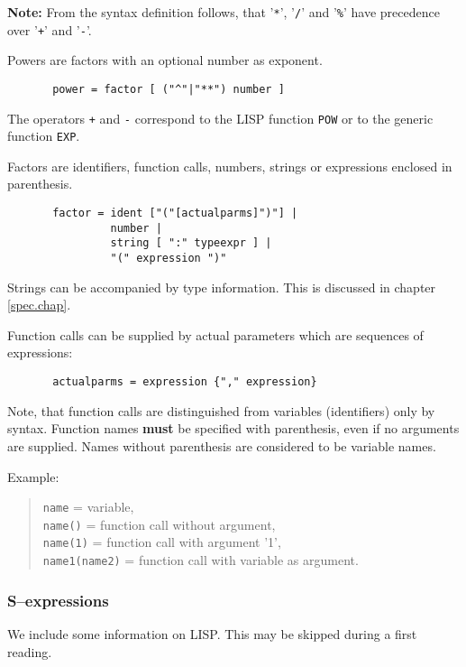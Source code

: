 {\bf Note:} From the syntax definition follows, that 
'\verb/*/', '\verb./.' and '\verb/%/' have precedence
over '\verb/+/' and '\verb/-/'.

Powers are factors with an optional number as exponent.
\begin{verbatim}
       power = factor [ ("^"|"**") number ]
\end{verbatim}
The operators \verb/+/ and \verb/-/ correspond to
the LISP function \verb/POW/  
or to the generic function \verb/EXP/.

Factors are identifiers, function calls, numbers, strings
or expressions enclosed in parenthesis.
\begin{verbatim}
       factor = ident ["("[actualparms]")"] |
                number | 
                string [ ":" typeexpr ] |
                "(" expression ")"
\end{verbatim}
Strings can be accompanied by type information. 
This is discussed in chapter \ref{spec.chap}.

Function calls can be supplied by actual parameters which
are sequences of expressions:
\begin{verbatim}
       actualparms = expression {"," expression}
\end{verbatim}

Note, that function calls are distinguished from 
variables (identifiers) only by syntax. 
Function names {\bf must} be specified with
parenthesis, even if no arguments are supplied.
Names without parenthesis are considered to be
variable names.

Example:
\begin{quote}
       \verb/name/         = variable, \\
       \verb/name()/       = function call without argument, \\
       \verb/name(1)/      = function call with argument '1', \\
       \verb/name1(name2)/ = function call with variable as argument.
\end{quote}


\subsubsection{S--expressions}

We include some information on LISP. This may be skipped during 
a first reading. 

